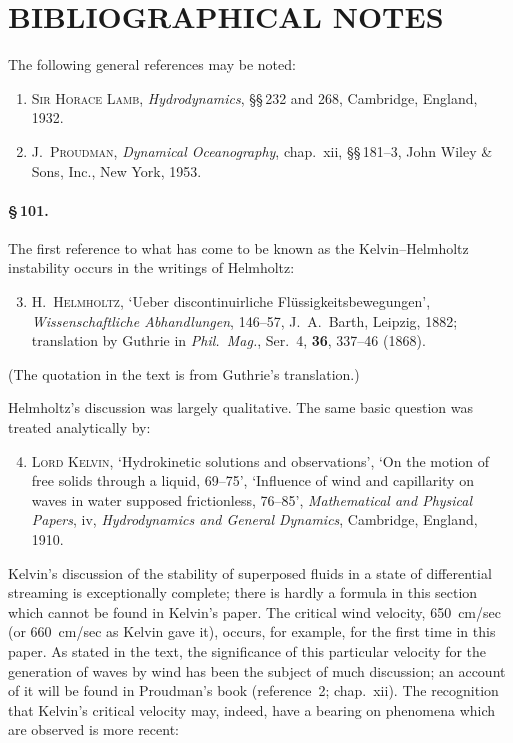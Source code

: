 \section*{BIBLIOGRAPHICAL NOTES}

The following general references may be noted:

\begin{enumerate}
\item \textsc{Sir Horace Lamb}, \emph{Hydrodynamics}, \S\S\,232 and 268,
  Cambridge, England, 1932.

\item J.~\textsc{Proudman}, \emph{Dynamical Oceanography}, chap.\ xii,
  \S\S\,181--3, John Wiley \& Sons, Inc., New York, 1953.
\end{enumerate}

\paragraph{\S\,101.}
The first reference to what has come to be known as the Kelvin--Helmholtz
instability occurs in the writings of Helmholtz:

\begin{enumerate}\setcounter{enumi}{2}
\item H.~\textsc{Helmholtz}, `Ueber discontinuirliche Fl\"ussigkeitsbewegungen',
  \emph{Wissenschaftliche Abhandlungen}, 146--57, J.~A.\ Barth, Leipzig, 1882;
  translation by Guthrie in \emph{Phil.\ Mag.}, Ser.~4, \textbf{36}, 337--46 (1868).
\end{enumerate}

\noindent
(The quotation in the text is from Guthrie's translation.)

Helmholtz's discussion was largely qualitative. The same basic question was
treated analytically by:

\begin{enumerate}\setcounter{enumi}{3}
\item \textsc{Lord Kelvin}, `Hydrokinetic solutions and observations',
  `On the motion of free solids through a liquid, 69--75',
  `Influence of wind and capillarity on waves in water supposed frictionless,
  76--85', \emph{Mathematical and Physical Papers}, iv,
  \emph{Hydrodynamics and General Dynamics}, Cambridge, England, 1910.
\end{enumerate}

\noindent
Kelvin's discussion of the stability of superposed fluids in a state of
differential streaming is exceptionally complete; there is hardly a formula
in this section which cannot be found in Kelvin's paper. The critical wind
velocity, 650~cm/sec (or 660~cm/sec as Kelvin gave it), occurs, for example,
for the first time in this paper. As stated in the text, the significance
of this particular velocity for the generation of waves by wind has been the
subject of much discussion; an account of it will be found in Proudman's book
(reference~2; chap.\ xii). The recognition that Kelvin's critical velocity
may, indeed, have a bearing on phenomena which are observed is more recent:

